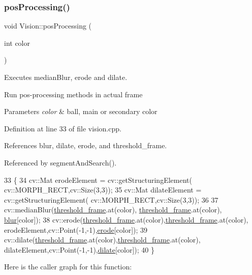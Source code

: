 \subsubsection{\texorpdfstring{pos\+Processing()}{posProcessing()}}
{\footnotesize\ttfamily void Vision\+::pos\+Processing (\begin{DoxyParamCaption}\item[{int}]{color }\end{DoxyParamCaption})\hspace{0.3cm}{\ttfamily [private]}}



Executes median\+Blur, erode and dilate. 

Run pos-\/processing methods in actual frame 
\begin{DoxyParams}{Parameters}
{\em color} & ball, main or secondary color \\
\hline
\end{DoxyParams}


Definition at line 33 of file vision.\+cpp.



References blur, dilate, erode, and threshold\+\_\+frame.



Referenced by segment\+And\+Search().


\begin{DoxyCode}
33                                     \{
34     cv::Mat erodeElement = cv::getStructuringElement( cv::MORPH\_RECT,cv::Size(3,3));
35     cv::Mat dilateElement = cv::getStructuringElement( cv::MORPH\_RECT,cv::Size(3,3));
36 
37     cv::medianBlur(\hyperlink{class_vision_a2fee2db2d4fe0cee6b2de36ee0eb6c7f}{threshold\_frame}.at(color), \hyperlink{class_vision_a2fee2db2d4fe0cee6b2de36ee0eb6c7f}{threshold\_frame}.at(color), 
      \hyperlink{class_vision_a48d1a64140429848f9a75a9d46c6e920}{blur}[color]);
38     cv::erode(\hyperlink{class_vision_a2fee2db2d4fe0cee6b2de36ee0eb6c7f}{threshold\_frame}.at(color),\hyperlink{class_vision_a2fee2db2d4fe0cee6b2de36ee0eb6c7f}{threshold\_frame}.at(color),
      erodeElement,cv::Point(-1,-1),\hyperlink{class_vision_a441302204181d31885b611e10ea92489}{erode}[color]);
39     cv::dilate(\hyperlink{class_vision_a2fee2db2d4fe0cee6b2de36ee0eb6c7f}{threshold\_frame}.at(color),\hyperlink{class_vision_a2fee2db2d4fe0cee6b2de36ee0eb6c7f}{threshold\_frame}.at(color),
      dilateElement,cv::Point(-1,-1),\hyperlink{class_vision_a406af58255882218a4d49f41b7e3a67a}{dilate}[color]);
40 \}
\end{DoxyCode}
Here is the caller graph for this function\+:
\mbox{\label{class_vision_ac0c3f793197c5fec6dddb22ff7c7383c}} 
